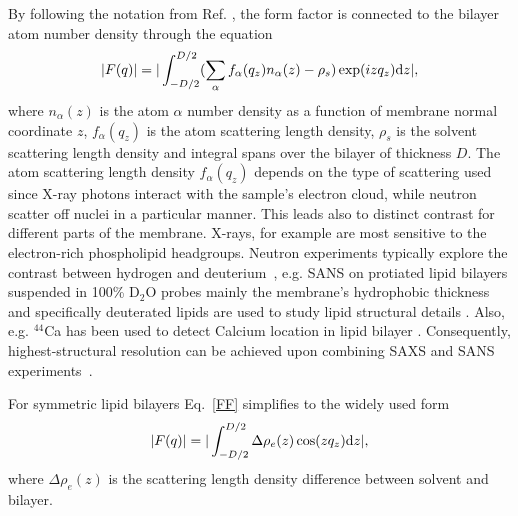 \documentclass[aps,prl,superscriptaddress,twocolumn]{revtex4}
\begin{document}
By following the notation from Ref. \cite{kucerka10}, the form factor is connected to the bilayer atom number density through the 
equation 
\begin{equation}\label{FF}
|F(q)|=|\int_{-D/2}^{D/2}(\sum_\alpha f_\alpha(q_z)n_\alpha(z) - \rho_s) \exp(i z q_z) {\rm d}z|,
\end{equation}
where $n_\alpha(z)$ is the atom $\alpha$ number density as a function of membrane normal coordinate $z$,
$f_\alpha(q_z)$ is the atom scattering length density,
$\rho_s$ is the solvent scattering length density and integral spans over the bilayer of thickness $D$.
The atom scattering length density $f_\alpha(q_z)$ depends on the type of scattering used since
X-ray photons interact with the sample's electron cloud, while neutron scatter off nuclei in a particular manner.
This leads also to distinct contrast for different parts of the membrane. X-rays, for example are most sensitive to the electron-rich 
phospholipid headgroups. Neutron experiments typically explore the contrast between hydrogen and deuterium~\cite{marquardt15},
e.g. SANS on protiated lipid bilayers suspended in 100\% D$_2$O probes mainly the membrane's hydrophobic thickness
and specifically deuterated lipids are used to study lipid structural details \cite{buldt78,buldt79}.
Also, e.g. $^{44}$Ca has been used to detect Calcium location in lipid bilayer \cite{herbette84}.
Consequently, highest-structural resolution can be achieved upon combining SAXS and SANS experiments~\cite{kucerka05a,kucerka08a}.

For symmetric lipid bilayers Eq.~\ref{FF} simplifies to the widely used form
\begin{equation}\label{FFsimpl}
|F(q)|=|\int_{-D/2}^{D/2}\Delta \rho_e(z) \cos(zq_z) {\rm d}z|,
\end{equation}
where $\Delta \rho_e(z)$ is the scattering length density difference between solvent and bilayer.



\end{document}
